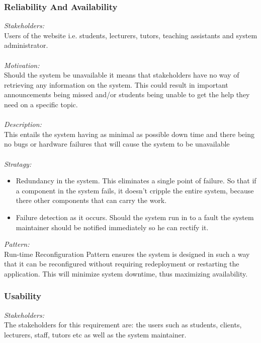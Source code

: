 \documentclass[a4paper,12pt]{report}
\begin{document}
		\subsubsection{Reliability And Availability}
		\emph{Stakeholders: }\\ Users of the website i.e. students, lecturers, tutors, teaching assistants and system administrator. \\
		\\\emph{Motivation: }\\ Should the system be unavailable it means that stakeholders have no way of retrieving any information on the system. This could result in important announcements being missed and/or students being unable to get the help they need on a specific topic. \\
		\\\emph{Description: }\\ This entails the system having as minimal as possible down time and there being no bugs or hardware failures that will cause the system to be unavailable \\
		\\\emph{Stratagy: }\\
		\begin{itemize}
		\item Redundancy in the system. This eliminates a single point of failure. So that if a component in the system fails, it doesn’t cripple the entire system, because there other components that can carry the work.
		
		\item Failure detection as it occurs. Should the system run in to a fault the system maintainer should be notified immediately so he can rectify it. 
		\end{itemize}
		
		\emph{Pattern: }\\ Run-time Reconfiguration Pattern ensures the system is designed in such a way that it can be reconfigured without requiring redeployment or restarting the application. This will minimize system downtime, thus maximizing availability.
		
		\subsubsection{Usability}
		\emph{Stakeholders: }\\ The stakeholders for this requirement are: the users such as students, clients, lecturers, staff, tutors etc as well as the system maintainer.\\
		
\end{document}
